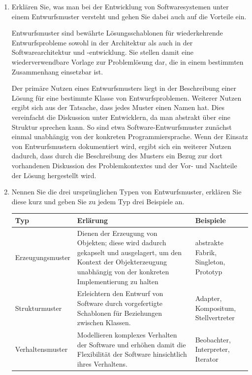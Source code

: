 \documentclass{lehramt-informatik}
\begin{document}
\begin{enumerate}


\item Erklären Sie, was man bei der Entwicklung von Softwaresystemen
unter einem Entwurfsmuster versteht und gehen Sie dabei auch auf die
Vorteile ein.

\begin{antwort}
Entwurfsmuster sind bewährte Lösungsschablonen für wiederkehrende
Entwurfsprobleme sowohl in der Architektur als auch in der
Softwarearchitektur und -entwicklung. Sie stellen damit eine
wiederverwendbare Vorlage zur Problemlösung dar, die in einem bestimmten
Zusammenhang einsetzbar ist.

Der primäre Nutzen eines Entwurfsmusters liegt in der Beschreibung einer
Lösung für eine bestimmte Klasse von Entwurfsproblemen. Weiterer Nutzen
ergibt sich aus der Tatsache, dass jedes Muster einen Namen hat. Dies
vereinfacht die Diskussion unter Entwicklern, da man abstrakt über eine
Struktur sprechen kann. So sind etwa Software-Entwurfsmuster zunächst
einmal unabhängig von der konkreten Programmiersprache. Wenn der Einsatz
von Entwurfsmustern dokumentiert wird, ergibt sich ein weiterer Nutzen
dadurch, dass durch die Beschreibung des Musters ein Bezug zur dort
vorhandenen Diskussion des Problemkontextes und der Vor- und Nachteile
der Lösung hergestellt wird.
\end{antwort}


\item Nennen Sie die drei ursprünglichen Typen von Entwurfsmuster,
erklären Sie diese kurz und geben Sie zu jedem Typ drei Beispiele an.

\begin{antwort}

\begin{tabularx}{\linewidth}{p{2cm}|X|p{2cm}}
\textbf{Typ} & \textbf{Erlärung} & \textbf{Beispiele} \\\hline\hline

Erzeugungsmuster &
Dienen der Erzeugung von Objekten; diese wird dadurch gekapselt und
ausgelagert, um den Kontext der Objekterzeugung unabhängig von der
konkreten Implementierung zu halten &
abstrakte Fabrik, Singleton, Prototyp \\\hline

Strukturmuster &
Erleichtern den Entwurf von Software durch vorgefertigte Schablonen für
Beziehungen zwischen Klassen. &
Adapter, Kompositum, Stellvertreter \\\hline

Verhaltensmuster  &
Modellieren komplexes Verhalten der Software und erhöhen damit die
Flexibilität der Software hinsichtlich ihres Verhaltens. &
Beobachter, Interpreter, Iterator \\
\end{tabularx}
\end{antwort}
\end{enumerate}
\end{document}
